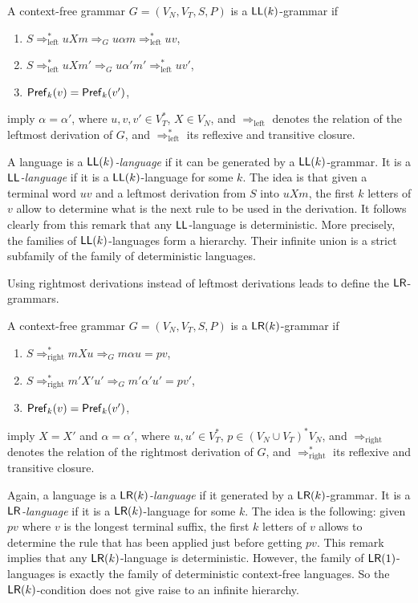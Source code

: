 A context-free grammar $G = (V_N, V_T, S, P)$ is a $\textup{\sf LL}(k)$-grammar if

\begin{enumerate}[]
\item $S \Rightarrow^*_{\text{left}} u X m \Rightarrow_G u \alpha m \Rightarrow^*_{\text{left}} uv$,
\item $S \Rightarrow^*_{\text{left}} u X m' \Rightarrow_G u \alpha' m' \Rightarrow^*_{\text{left}} uv'$,
\item $\textup{\sf Pref\/}_k(v) = \textup{\sf Pref\/}_k(v')$,
\end{enumerate}

\noindent imply $\alpha = \alpha'$, where $u, v, v' \in V_T^*$, $X \in V_N$, and $\Rightarrow_{\text{left}}$ denotes the relation of the leftmost derivation of $G$, and $\Rightarrow^*_{\text{left}}$ its reflexive and transitive closure.

A language is a \emph{$\textup{\sf LL}(k)$-language} if it can be generated by a $\textup{\sf LL}(k)$-grammar. It is a \emph{$\textup{\sf LL}$-language} if it is a $\textup{\sf LL}(k)$-language for some $k$. The idea is that given a terminal word $uv$ and a leftmost derivation from $S$ into $uXm$, the first $k$ letters of $v$ allow to determine what is the next rule to be used in the derivation. It follows clearly from this remark that any $\textup{\sf LL}$-language is deterministic. More precisely, the families of $\textup{\sf LL}(k)$-languages form a hierarchy. Their infinite union is a strict subfamily of the family of deterministic languages.

Using rightmost derivations instead of leftmost derivations leads to define the $\textup{\sf LR}$-grammars.

A context-free grammar $G = (V_N, V_T, S, P)$ is a $\textup{\sf LR}(k)$-grammar if

\begin{enumerate}[]
\item $S \Rightarrow^*_{\text{right}} m X u \Rightarrow_G m \alpha u = pv$,
\item $S \Rightarrow^*_{\text{right}} m' X' u' \Rightarrow_G m' \alpha' u' = pv'$,
\item $\textup{\sf Pref\/}_k(v) = \textup{\sf Pref\/}_k(v')$,
\end{enumerate}

\noindent imply $X = X'$ and $\alpha = \alpha'$, where $u, u' \in V_T^*$, $p \in (V_N \cup V_T)^* V_N$, and $\Rightarrow_{\text{right}}$ denotes the relation of the rightmost derivation of $G$, and $\Rightarrow^*_{\text{right}}$ its reflexive and transitive closure.

Again, a language is a \emph{$\textup{\sf LR}(k)$-language} if it generated by a $\textup{\sf LR}(k)$-grammar. It is a \emph{$\textup{\sf LR}$-language} if it is a $\textup{\sf LR}(k)$-language for some $k$. The idea is the following: given $pv$ where $v$ is the longest terminal suffix, the first $k$ letters of $v$ allows to determine the rule that has been applied just before getting $pv$. This remark implies that any $\textup{\sf LR}(k)$-language is deterministic. However, the family of $\textup{\sf LR}(1)$-languages is exactly the family of deterministic context-free languages. So the $\textup{\sf LR}(k)$-condition does not give raise to an infinite hierarchy.

